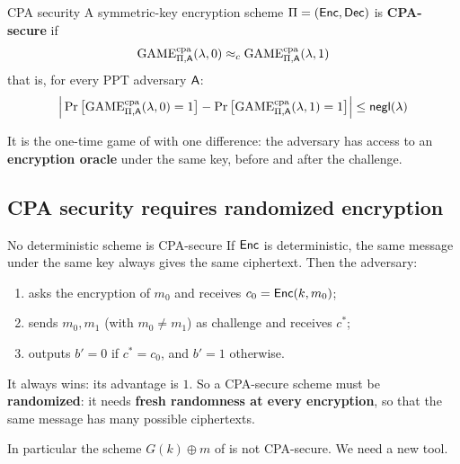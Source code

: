 \begin{center}
\end{center}

\begin{frameddefn}[label={def:cpa-security}]{CPA security}
  A symmetric-key encryption scheme $\Pi = (\mathsf{Enc}, \mathsf{Dec})$ is \textbf{CPA-secure} if
  \[
    \mathrm{GAME}^{\text{cpa}}_{\Pi,\mathsf{A}}(\lambda, 0) \approx_c \mathrm{GAME}^{\text{cpa}}_{\Pi,\mathsf{A}}(\lambda, 1)
  \]
  that is, for every PPT adversary $\mathsf{A}$:
  \[
    \Big|\Pr\big[\mathrm{GAME}^{\text{cpa}}_{\Pi,\mathsf{A}}(\lambda, 0) = 1\big] - \Pr\big[\mathrm{GAME}^{\text{cpa}}_{\Pi,\mathsf{A}}(\lambda, 1) = 1\big]\Big| \leq \mathsf{negl}(\lambda)
  \]
\end{frameddefn}

It is the one-time game of  with one difference: the adversary has access to an \textbf{encryption oracle} under the same key, before and after the challenge.

\subsection{CPA security requires randomized encryption}

\begin{framedobs}[label={obs:deterministic-cpa}]{No deterministic scheme is CPA-secure}
  If $\mathsf{Enc}$ is deterministic, the same message under the same key always gives the same ciphertext. Then the adversary:
  \begin{enumerate}
    \item asks the encryption of $m_0$ and receives $c_0 = \mathsf{Enc}(k, m_0)$;
    \item sends $m_0, m_1$ (with $m_0 \neq m_1$) as challenge and receives $c^*$;
    \item outputs $b' = 0$ if $c^* = c_0$, and $b' = 1$ otherwise.
  \end{enumerate}
  It always wins: its advantage is $1$. So a CPA-secure scheme must be \textbf{randomized}: it needs \textbf{fresh randomness at every encryption}, so that the same message has many possible ciphertexts.
\end{framedobs}

In particular the scheme $G(k) \oplus m$ of  is not CPA-secure. We need a new tool.
